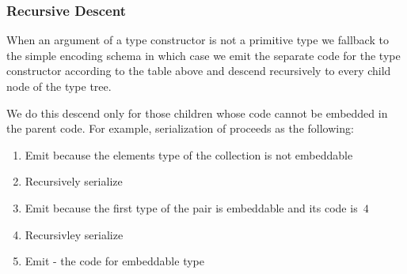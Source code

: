 \subsubsection{Recursive Descent}
\label{sec:ser:type:recursive}

When an argument of a type constructor is not a primitive type we fallback to the
simple encoding schema in which case we emit the separate code for the type constructor
according to the table above and descend recursively to every child node of the type
tree.

We do this descend only for those children whose code cannot be embedded in
the parent code. For example, serialization of 
proceeds as the following:
\begin{enumerate}
\item Emit  because the elements type of the collection is not embeddable 
\item Recursively serialize 
\item Emit  because the first type of the pair is embeddable and its code is~$4$
\item Recursivley serialize 
\item Emit  - the code for embeddable type 
\end{enumerate}

